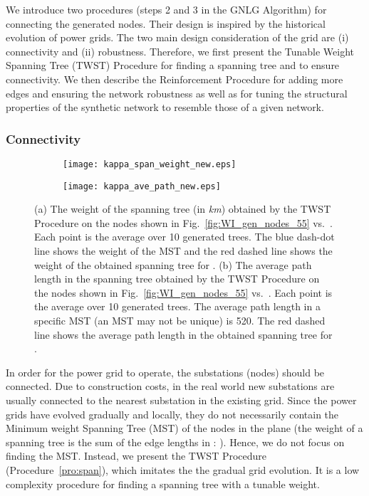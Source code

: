 \documentclass[10pt,journal]{IEEEtran}
\begin{document}
We introduce two procedures (steps 2 and 3 in the GNLG Algorithm)  for connecting the generated nodes. Their design is inspired by the historical evolution of power grids.
The two main design consideration of the grid are (i) connectivity and (ii) robustness. Therefore, we first present the Tunable Weight Spanning Tree (TWST) Procedure for finding a spanning tree and to ensure connectivity. We then describe the Reinforcement Procedure for adding more edges and ensuring the network robustness as well as for tuning the structural properties of the synthetic network to resemble those of a given network.

\subsubsection{Connectivity}


\begin{figure}[t]
\centering
\begin{subfigure}[b]{0.24\textwidth}
\vspace*{-0.2cm}
\texttt{[image: kappa\_span\_weight\_new.eps]}
\vspace*{-0.2cm}
\caption{}
\label{fig:kappa_span_weight}
\vspace*{0.2cm}
\end{subfigure}
\begin{subfigure}[b]{0.24\textwidth}
\vspace*{-0.2cm}
\texttt{[image: kappa\_ave\_path\_new.eps]}
\vspace*{-0.2cm}
\caption{}
\label{fig:kappa_ave_path}
\vspace*{0.2cm}
\end{subfigure}
\caption{(a) The weight of the spanning tree (in \emph{km}) obtained by the TWST Procedure on the nodes shown in Fig.~\ref{fig:WI_gen_nodes_55} vs.\ . Each point is the average over 10 generated trees. The blue dash-dot line shows the weight of the MST and the red dashed line shows the weight of the obtained spanning tree for . (b) The average path length in the spanning tree obtained by the TWST Procedure on the nodes shown in Fig.~\ref{fig:WI_gen_nodes_55} vs.\ . Each point is the average over 10 generated trees. The average path length in a specific MST (an MST may not be unique) is 520. The red dashed line shows the average path length in the obtained spanning tree for .}
\label{fig:kappa}
\end{figure}



In order for the power grid to operate, the substations (nodes) should be connected. Due to construction costs, in the real world new substations are usually connected to the nearest substation in the existing grid. Since the power grids have evolved gradually and locally, they do not necessarily contain the Minimum weight Spanning Tree (MST) of the nodes in the plane (the weight of a spanning tree  is the sum of the edge lengths in :
 ).
 Hence, we do not focus on finding the MST. Instead, we present the TWST Procedure (Procedure~\ref{pro:span}), which imitates the the gradual grid evolution. It is a low complexity procedure for finding a spanning tree with a tunable weight.
\end{document}
